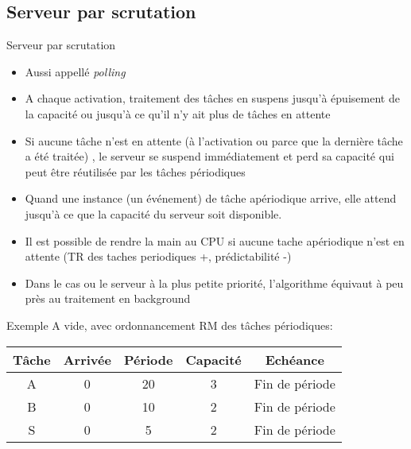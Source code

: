 \subsection{Serveur par scrutation}

\begin{frame}{Serveur par scrutation}
  \begin{itemize}
  \item Aussi appellé \emph{polling}
  \item A chaque activation,  traitement des tâches en suspens jusqu'à
    épuisement  de la capacité  ou jusqu'à  ce qu'il  n'y ait  plus de
    tâches en attente
  \item Si aucune tâche n'est  en attente (à l'activation ou parce que
    la  dernière  tâche  a  été  traitée)  ,  le  serveur  se  suspend
    immédiatement et perd sa capacité qui peut être réutilisée par les
    tâches périodiques
  \item Quand une instance (un événement) de tâche apériodique arrive,
    elle attend jusqu’à ce que la capacité du serveur soit disponible.
  \item  Il est  possible de  rendre la  main au  CPU si  aucune tache
    apériodique  n'est  en  attente  (TR  des  taches  periodiques  +,
    prédictabilité -)
  \item  Dans  le  cas  ou  le  serveur à  la  plus  petite  priorité,
    l'algorithme équivaut à peu près au traitement en background
  \end{itemize}
\end{frame} 

\begin{frame}{Exemple}
  A vide, avec ordonnancement RM des tâches périodiques:
  \begin{center}
    \begin{tabular}{ccccc}
      \hline
      Tâche & Arrivée & Période & Capacité & Echéance \\
      \hline
      A & 0 & 20 & 3 & Fin de période\\
      B & 0 & 10 & 2 & Fin de période\\
      S & 0 &  5 & 2 & Fin de période\\
      \hline
    \end{tabular}
  \end{center}
\end{frame} 

